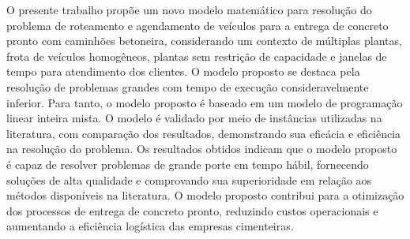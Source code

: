O presente trabalho propõe um novo modelo matemático para resolução do problema de roteamento e agendamento de veículos para a entrega de concreto pronto com caminhões betoneira, considerando um contexto de múltiplas plantas, frota de veículos homogêneos, plantas sem restrição de capacidade e janelas de tempo para atendimento dos clientes. O modelo proposto se destaca pela resolução de problemas grandes com tempo de execução consideravelmente inferior. Para tanto, o modelo proposto é baseado em um modelo de programação linear inteira mista. O modelo é validado por meio de instâncias utilizadas na literatura, com comparação dos resultados, demonstrando sua eficácia e eficiência na resolução do problema. Os resultados obtidos indicam que o modelo proposto é capaz de resolver problemas de grande porte em tempo hábil, fornecendo soluções de alta qualidade e comprovando sua superioridade em relação aos métodos disponíveis na literatura. O modelo proposto contribui para a otimização dos processos de entrega de concreto pronto, reduzindo custos operacionais e aumentando a eficiência logística das empresas cimenteiras.